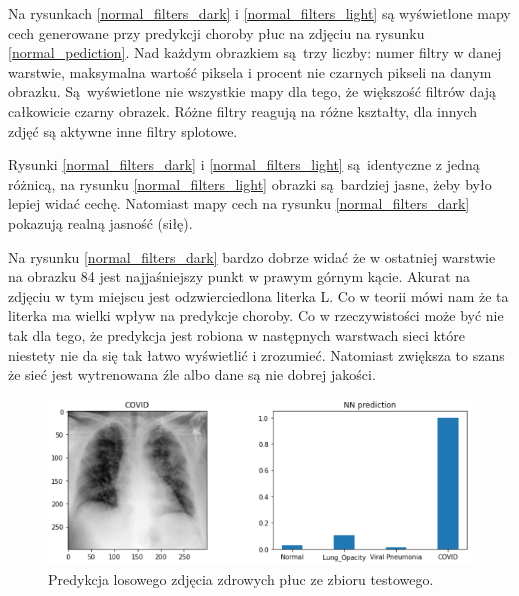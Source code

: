 \documentclass{article}
\begin{document}
Na rysunkach \ref{normal_filters_dark} i \ref{normal_filters_light} są wyświetlone mapy cech generowane przy predykcji choroby płuc na zdjęciu na rysunku \ref{normal_pediction}. Nad każdym obrazkiem są trzy liczby: numer filtry w danej warstwie, maksymalna wartość piksela i procent nie czarnych pikseli na danym obrazku. Są wyświetlone nie wszystkie mapy dla tego, że większość filtrów dają całkowicie czarny obrazek. Różne filtry reagują na różne kształty, dla innych zdjęć są aktywne inne filtry splotowe.

Rysunki \ref{normal_filters_dark} i \ref{normal_filters_light} są identyczne z jedną różnicą, na rysunku \ref{normal_filters_light} obrazki są bardziej jasne, żeby było lepiej widać cechę. Natomiast mapy cech na rysunku \ref{normal_filters_dark} pokazują realną jasność (siłę).

Na rysunku \ref{normal_filters_dark} bardzo dobrze widać że w ostatniej warstwie na obrazku 84 jest najjaśniejszy punkt w prawym górnym kącie. Akurat na zdjęciu w tym miejscu jest odzwierciedlona literka L. Co w teorii mówi nam że ta literka ma wielki wpływ na predykcje choroby. Co w rzeczywistości może być nie tak dla tego, że predykcja jest robiona w następnych warstwach sieci które niestety nie da się tak łatwo wyświetlić i zrozumieć. Natomiast zwiększa to szans że sieć jest wytrenowana źle albo dane są nie dobrej jakości.  


\begin{figure}[H]
	\centering
	\includegraphics[width=1\textwidth,keepaspectratio=true]{covid_prediction}
	\caption{Predykcja losowego zdjęcia zdrowych płuc ze zbioru testowego.}
	\label{covid_pediction}
\end{figure}
\end{document}
